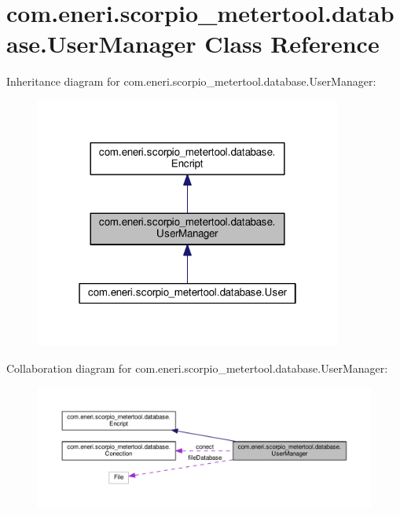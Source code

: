 \hypertarget{classcom_1_1eneri_1_1scorpio__metertool_1_1database_1_1_user_manager}{}\section{com.\+eneri.\+scorpio\+\_\+metertool.\+database.\+User\+Manager Class Reference}
\label{classcom_1_1eneri_1_1scorpio__metertool_1_1database_1_1_user_manager}


Inheritance diagram for com.\+eneri.\+scorpio\+\_\+metertool.\+database.\+User\+Manager\+:
\nopagebreak
\begin{figure}[H]
\begin{center}
\leavevmode
\includegraphics[width=286pt]{classcom_1_1eneri_1_1scorpio__metertool_1_1database_1_1_user_manager__inherit__graph}
\end{center}
\end{figure}


Collaboration diagram for com.\+eneri.\+scorpio\+\_\+metertool.\+database.\+User\+Manager\+:
\nopagebreak
\begin{figure}[H]
\begin{center}
\leavevmode
\includegraphics[width=350pt]{classcom_1_1eneri_1_1scorpio__metertool_1_1database_1_1_user_manager__coll__graph}
\end{center}
\end{figure}
